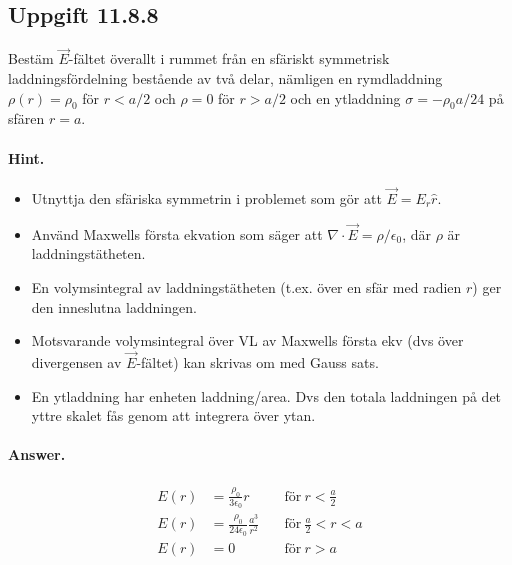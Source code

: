 \documentclass[%
oneside,                 %
final,                   %
10pt]{article}
\newenvironment{doconceexercise}{}{}
\newcounter{doconceexercisecounter}
\begin{document}
\begin{doconceexercise}

\subsection*{Uppgift 11.8.8}

Bestäm $\vec{E}$-fältet överallt i rummet från en sfäriskt symmetrisk laddningsfördelning bestående av två delar, nämligen en rymdladdning $\rho(r) = \rho_0$ för $r< a/2$ och $\rho = 0$ för $r > a/2$ och en ytladdning $\sigma = -\rho_0 a/24$ på sfären $r = a$.


\paragraph{Hint.}
\begin{itemize}
\item Utnyttja den sfäriska symmetrin i problemet som gör att $\vec{E} = E_r \hat{r}$.

\item Använd Maxwells första ekvation som säger att $\nabla \cdot \vec{E} = \rho / \epsilon_0$, där $\rho$ är laddningstätheten.

\item En volymsintegral av laddningstätheten (t.ex. över en sfär med radien $r$) ger den inneslutna laddningen.

\item Motsvarande volymsintegral över VL av Maxwells första ekv (dvs över divergensen av $\vec{E}$-fältet) kan skrivas om med Gauss sats.

\item En ytladdning har enheten laddning/area. Dvs den totala laddningen på det yttre skalet fås genom att integrera över ytan.
\end{itemize}

\noindent


\paragraph{Answer.}
\begin{align}
E\left(r\right) &= \frac{\rho_0}{3 \epsilon_0} r \quad & \mathrm{för~} r < \frac{a}{2} \\
E\left(r\right) &=\frac{\rho_0}{24\epsilon_0} \frac{a^3}{r^2} \quad & \mathrm{för~} \frac{a}{2} < r < a \\
E\left(r\right) &= 0 \quad & \mathrm{för~} r > a
\end{align}


\end{doconceexercise}
\end{document}

